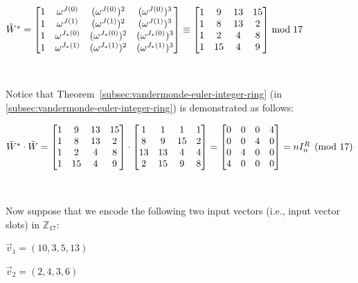 $ $ 

$\tilde{W}^* = \begin{bmatrix}
1 & \omega^{J(0)} & (\omega^{J(0)})^2 & (\omega^{J(0)})^3\\
1 & \omega^{J(1)} & (\omega^{J(1)})^2 & (\omega^{J(1)})^3\\
1 & \omega^{J_*(0)} & (\omega^{J_*(0)})^2 & (\omega^{J_*(0)})^3\\
1 & \omega^{J_*(1)} & (\omega^{J_*(1)})^2 & (\omega^{J_*(1)})^3\\
\end{bmatrix} \equiv \begin{bmatrix}
1 & 9 & 13 & 15\\
1 & 8 & 13 & 2\\
1 & 2 & 4 & 8\\
1 & 15 & 4 & 9\\
\end{bmatrix}  \bmod{17}$

$ $

Notice that Theorem~\ref*{subsec:vandermonde-euler-integer-ring} (in \autoref{subsec:vandermonde-euler-integer-ring}) is demonstrated as follows:

$\tilde{W}^* \cdot \tilde{W} = \begin{bmatrix}
1 & 9 & 13 & 15\\
1 & 8 & 13 & 2\\
1 & 2 & 4 & 8\\
1 & 15 & 4 & 9\\
\end{bmatrix} \cdot \begin{bmatrix}
1 & 1 & 1 & 1\\
8 & 9 & 15 & 2\\
13 & 13 & 4 & 4\\
2 & 15 & 9 & 8\\
\end{bmatrix} = \begin{bmatrix}
0 & 0 & 0 & 4\\
0 & 0 & 4 & 0\\
0 & 4 & 0 & 0\\
4 & 0 & 0 & 0\\
\end{bmatrix} = n I_n^{R} \pmod{17}$

$ $

Now suppose that we encode the following two input vectors (i.e., input vector slots) in $\mathbb{Z}_{17}$:

$\vec{v}_1 = (10, 3, 5, 13)$

$\vec{v}_2 = (2, 4, 3, 6)$

